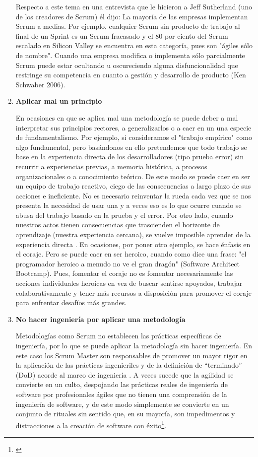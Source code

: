 \begin{enumerate}
Respecto a este tema en una entrevista que le hicieron a Jeff Sutherland (uno de los creadores de Scrum) él dijo: La mayoría de las empresas implementan Scrum a medias. Por ejemplo, cualquier Scrum sin producto de trabajo al final de un Sprint es un Scrum fracasado y el 80 por ciento del Scrum escalado en Silicon Valley se encuentra en esta categoría, pues son "ágiles sólo de nombre". Cuando una empresa modifica o implementa sólo parcialmente Scrum puede estar ocultando u oscureciendo alguna disfuncionalidad que restringe su competencia en cuanto a gestión y desarrollo de producto (Ken Schwaber 2006).


\item \textbf{Aplicar mal un principio}

En ocasiones en que se aplica mal una metodología se puede deber a mal interpretar sus principios rectores, a generalizarlos o a caer en un una especie de fundamentalismo. Por ejemplo, si consideramos el "trabajo empírico" como algo fundamental, pero basándonos en ello pretendemos que todo trabajo se base en la experiencia directa de los desarrolladores (tipo prueba error) sin recurrir a experiencias previas, a memoria histórica, a procesos organizacionales o a conocimiento teórico. De este modo se puede caer en ser un equipo de trabajo reactivo, ciego de las consecuencias a largo plazo de sus acciones e ineficiente. No es necesario reinventar la rueda cada vez que se nos presenta la necesidad de usar una y a veces eso es lo que ocurre cuando se abusa del trabajo basado en la prueba y el error. Por otro lado, cuando nuestros actos tienen consecuencias que trascienden el horizonte de aprendizaje (nuestra experiencia cercana), se vuelve imposible aprender de la experiencia directa \cite{Peter-Senge-1990}. 
En ocasiones, por poner otro ejemplo, se hace énfasis en el coraje. Pero se puede caer en ser heroico, cuando como dice una frase: "el programador heroico a menudo no ve el gran dragón" (Software Architect Bootcamp). Pues, fomentar el coraje no es fomentar necesariamente las acciones individuales heroicas en vez de buscar sentirse apoyados, trabajar colaborativamente y tener más recursos a disposición para promover el coraje para enfrentar desafíos más grandes.

\item \textbf{No hacer ingeniería por aplicar una metodología}

Metodologías como Scrum  no establecen las prácticas específicas de ingeniería, por lo que se puede aplicar la metodología sin hacer ingeniería. En este caso los Scrum Master son responsables de promover un mayor rigor en la aplicación de las prácticas ingenieriles y de la definición de “terminado” (DoD) acorde al marco de ingeniería \cite{Gantthead-James-2010}. A veces sucede que la agilidad se convierte en un culto, despojando las prácticas reales de ingeniería de software por profesionales ágiles que no tienen una comprensión de la ingeniería de software, y de este modo simplemente se convierte en un conjunto de rituales sin sentido que, en su mayoría, son impedimentos y distracciones a la creación de software con éxito\footnote{\cite{Victor-Hugo-Certuche-2016} \cite{Mike-Hadlow-2014}}.


\end{enumerate}
